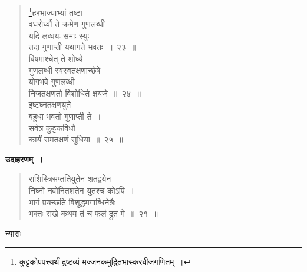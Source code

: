 \documentclass[11pt, openany]{book}
\begin{document}
\newpage

 \label{9.25}
\begin{quote}
{\gk \renewcommand{\thefootnote}{१}\footnote{कुट्टकोपपत्त्यर्थं द्रष्टव्यं मज्जनकमुद्रितभास्करबीजगणितम्~।}हरभाज्याभ्यां तष्टा-\\
वधरोर्ध्वौ ते क्रमेण गुणलब्धी~।\\
यदि लब्धयः समाः स्युः\\
तदा गुणाप्ती यथागते भवतः~॥~२३~॥\\
विषमाश्चेत् ते शोध्ये\\
गुणलब्धी स्वस्वतक्षणाच्छेषे~।\\
योगभवे गुणलब्धी\\
निजतक्षणतो विशोधिते क्षयजे~॥~२४~॥\\
इष्टघ्नतक्षणयुते\\
बहुधा भवतो गुणाप्ती ते~।\\
सर्वत्र कुट्टकविधौ\\
कार्यं समतक्षणं सुधिया~॥~२५~॥}

\end{quote}

\textbf{उदाहरणम्~।} 
\begin{quote}
{\ex राशिस्त्रिसप्ततियुतेन शतद्वयेन\\
निघ्नो नवोनितशतेन युतश्च कोऽपि~।\\
भागं प्रयच्छति विशुद्धमगाब्धिनेत्रैः\\
भक्तः सखे कथय तं च फलं द्रुतं मे~॥~२१~॥	}
\end{quote}


\newpage

 	

न्यासः~। \\
\end{document}
